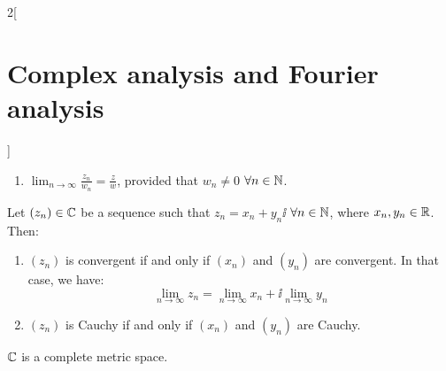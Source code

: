 \documentclass[../../../main.tex]{subfiles}
\begin{document}
\begin{multicols}{2}[\section{Complex analysis and Fourier analysis}]
\begin{prop}
\begin{enumerate}
      \item $\displaystyle\lim_{n\to\infty}\frac{z_n}{w_n}=\frac{z}{w}$, provided that $w_n\ne 0$ $\forall n\in\mathbb{N}$.
    \end{enumerate}
  \end{prop}
  \begin{definition}
    Let $(z_n)\in\mathbb{C}$ be a sequence such that $z_n=x_n+y_n\ii$ $\forall n\in\mathbb{N}$, where $x_n,y_n\in\mathbb{R}$. Then:
    \begin{enumerate}
      \item $(z_n)$ is convergent if and only if $(x_n)$ and $(y_n)$ are convergent. In that case, we have: $$\lim_{n\to\infty}z_n=\lim_{n\to\infty}x_n+\ii\lim_{n\to\infty}y_n$$
      \item $(z_n)$ is Cauchy if and only if $(x_n)$ and $(y_n)$ are Cauchy.
    \end{enumerate}
  \end{definition}
  \begin{theorem}
    $\mathbb{C}$ is a complete metric space.
  \end{theorem}

\end{multicols}
\end{document}
